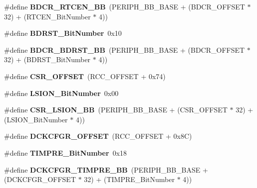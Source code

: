 \begin{DoxyCompactItemize}
\mbox{\label{group___r_c_c_gaf70aaf70b0752ccb3a60307b2fb46038}} 
\#define {\bfseries B\+D\+C\+R\+\_\+\+R\+T\+C\+E\+N\+\_\+\+BB}~(P\+E\+R\+I\+P\+H\+\_\+\+B\+B\+\_\+\+B\+A\+SE + (B\+D\+C\+R\+\_\+\+O\+F\+F\+S\+ET $\ast$ 32) + (R\+T\+C\+E\+N\+\_\+\+Bit\+Number $\ast$ 4))
\item 
\mbox{\label{group___r_c_c_gae6718158034388d8fde8caaa28ffe8b9}} 
\#define {\bfseries B\+D\+R\+S\+T\+\_\+\+Bit\+Number}~0x10
\item 
\mbox{\label{group___r_c_c_ga892fdf297b85b85cbaf0723649b31818}} 
\#define {\bfseries B\+D\+C\+R\+\_\+\+B\+D\+R\+S\+T\+\_\+\+BB}~(P\+E\+R\+I\+P\+H\+\_\+\+B\+B\+\_\+\+B\+A\+SE + (B\+D\+C\+R\+\_\+\+O\+F\+F\+S\+ET $\ast$ 32) + (B\+D\+R\+S\+T\+\_\+\+Bit\+Number $\ast$ 4))
\item 
\mbox{\label{group___r_c_c_ga984cbe73312b6d3d355c5053763d499a}} 
\#define {\bfseries C\+S\+R\+\_\+\+O\+F\+F\+S\+ET}~(R\+C\+C\+\_\+\+O\+F\+F\+S\+ET + 0x74)
\item 
\mbox{\label{group___r_c_c_ga3f9dbe50769ce2a63ae12520433b9b40}} 
\#define {\bfseries L\+S\+I\+O\+N\+\_\+\+Bit\+Number}~0x00
\item 
\mbox{\label{group___r_c_c_gaa253e36e7e5fb02998c0e4d0388abc52}} 
\#define {\bfseries C\+S\+R\+\_\+\+L\+S\+I\+O\+N\+\_\+\+BB}~(P\+E\+R\+I\+P\+H\+\_\+\+B\+B\+\_\+\+B\+A\+SE + (C\+S\+R\+\_\+\+O\+F\+F\+S\+ET $\ast$ 32) + (L\+S\+I\+O\+N\+\_\+\+Bit\+Number $\ast$ 4))
\item 
\mbox{\label{group___r_c_c_ga622e592eac9f955633832687cb4aacbd}} 
\#define {\bfseries D\+C\+K\+C\+F\+G\+R\+\_\+\+O\+F\+F\+S\+ET}~(R\+C\+C\+\_\+\+O\+F\+F\+S\+ET + 0x8\+C)
\item 
\mbox{\label{group___r_c_c_ga3e4d33566ef60a5220ce491e74a34478}} 
\#define {\bfseries T\+I\+M\+P\+R\+E\+\_\+\+Bit\+Number}~0x18
\item 
\mbox{\label{group___r_c_c_gaff212f4f5168f26347acf1abbb331961}} 
\#define {\bfseries D\+C\+K\+C\+F\+G\+R\+\_\+\+T\+I\+M\+P\+R\+E\+\_\+\+BB}~(P\+E\+R\+I\+P\+H\+\_\+\+B\+B\+\_\+\+B\+A\+SE + (D\+C\+K\+C\+F\+G\+R\+\_\+\+O\+F\+F\+S\+ET $\ast$ 32) + (T\+I\+M\+P\+R\+E\+\_\+\+Bit\+Number $\ast$ 4))

\end{DoxyCompactItemize}
